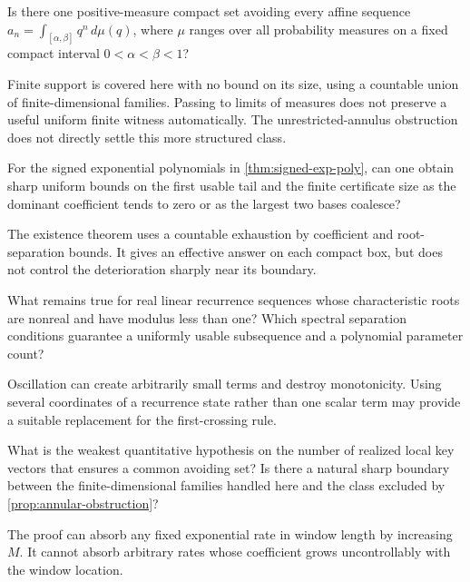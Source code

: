 \begin{question}
Is there one positive-measure compact set avoiding every affine
sequence $a_n=\int_{[\alpha,\beta]}q^n\,d\mu(q)$, where $\mu$ ranges
over all probability measures on a fixed compact interval
$0<\alpha<\beta<1$?
\end{question}
Finite support is covered here with no bound on its size, using a
countable union of finite-dimensional families. Passing to limits of
measures does not preserve a useful uniform finite witness automatically.
The unrestricted-annulus obstruction does not directly settle this
more structured class.

\begin{question}
For the signed exponential polynomials in \cref{thm:signed-exp-poly},
can one obtain sharp uniform bounds on the first usable tail and the
finite certificate size as the dominant coefficient tends to zero or
as the largest two bases coalesce?
\end{question}
The existence theorem uses a countable exhaustion by coefficient and
root-separation bounds. It gives an effective answer on each compact
box, but does not control the deterioration sharply near its boundary.

\begin{question}
What remains true for real linear recurrence sequences whose
characteristic roots are nonreal and have modulus less than one?
Which spectral separation conditions guarantee a uniformly usable
subsequence and a polynomial parameter count?
\end{question}
Oscillation can create arbitrarily small terms and destroy monotonicity.
Using several coordinates of a recurrence state rather than one scalar
term may provide a suitable replacement for the first-crossing rule.

\begin{question}
What is the weakest quantitative hypothesis on the number of realized
local key vectors that ensures a common avoiding set? Is there a
natural sharp boundary between the finite-dimensional families handled
here and the class excluded by \cref{prop:annular-obstruction}?
\end{question}
The proof can absorb any fixed exponential rate in window length by
increasing $M$. It cannot absorb arbitrary rates whose coefficient
grows uncontrollably with the window location.

